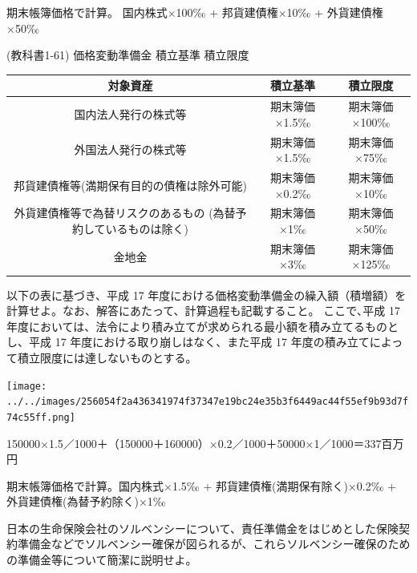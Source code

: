 \documentclass[report,gutter=10mm,fore-edge=10mm,uplatex,dvipdfmx]{jlreq}
\begin{document}
期末帳簿価格で計算。
国内株式×100‰ + 邦貨建債権×10‰ + 外貨建債権×50‰

(教科書1-61) 価格変動準備金 積立基準 積立限度 

\begin{tabular}{|c|c|c|}
\hline
対象資産 &積立基準 & 積立限度\\ \hline
国内法人発行の株式等 &期末簿価×1.5‰ &期末簿価×100‰\\ \hline
外国法人発行の株式等 &期末簿価×1.5‰ &期末簿価×75‰\\ \hline
邦貨建債権等(満期保有目的の債権は除外可能) &期末簿価×0.2‰ &期末簿価×10‰\\ \hline
外貨建債権等で為替リスクのあるもの (為替予約しているものは除く) &期末簿価×1‰ &期末簿価×50‰\\ \hline
金地金 &期末簿価×3‰ &期末簿価×125‰\\ \hline
\end{tabular}



以下の表に基づき、平成 17
年度における価格変動準備金の繰入額（積増額）を計算せよ。なお、解答にあたって、計算過程も記載すること。
ここで､平成 17
年度においては、法令により積み立てが求められる最小額を積み立てるものとし、平成
17 年度における取り崩しはなく、また平成 17
年度の積み立てによって積立限度には達しないものとする。

\texttt{[image: ../../images/256054f2a436341974f37347e19bc24e35b3f6449ac44f55ef9b93d7f74c55ff.png]}


150000×1.5／1000＋（150000＋160000）×0.2／1000＋50000×1／1000＝337百万円

期末帳簿価格で計算。国内株式×1.5‰ + 邦貨建債権(満期保有除く)×0.2‰ +
外貨建債権(為替予約除く)×1‰


日本の生命保険会社のソルベンシーについて、責任準備金をはじめとした保険契約準備金などでソルベンシー確保が図られるが、これらソルベンシー確保のための準備金等について簡潔に説明せよ。

\end{document}
